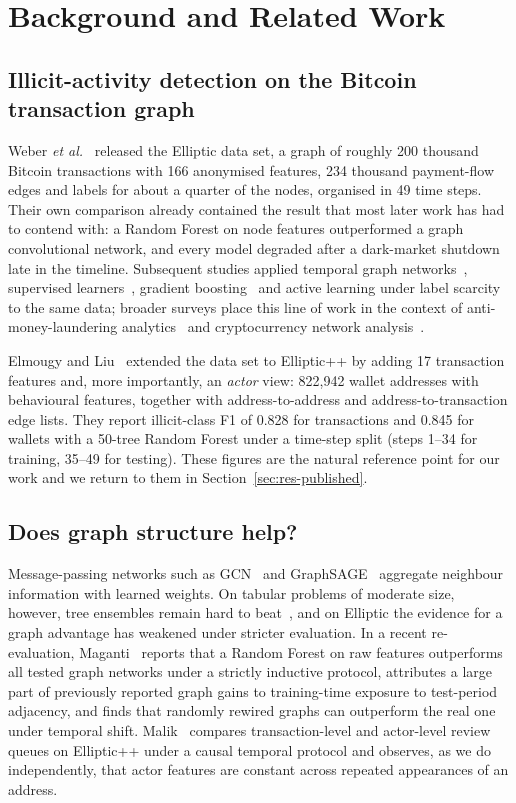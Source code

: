 \section{Background and Related Work}\label{sec:related}

\subsection{Illicit-activity detection on the Bitcoin transaction graph}
Weber \emph{et al.}~\cite{weber2019} released the Elliptic data set, a graph of roughly 200 thousand Bitcoin transactions with 166 anonymised features, 234 thousand payment-flow edges and labels for about a quarter of the nodes, organised in 49 time steps. Their own comparison already contained the result that most later work has had to contend with: a Random Forest on node features outperformed a graph convolutional network, and every model degraded after a dark-market shutdown late in the timeline. Subsequent studies applied temporal graph networks~\cite{pareja2020}, supervised learners~\cite{alarab2020}, gradient boosting~\cite{vassallo2021} and active learning under label scarcity~\cite{lorenz2020} to the same data; broader surveys place this line of work in the context of anti-money-laundering analytics~\cite{chen2018} and cryptocurrency network analysis~\cite{wu2021}.

Elmougy and Liu~\cite{elmougy2023} extended the data set to Elliptic++ by adding 17 transaction features and, more importantly, an \emph{actor} view: 822,942 wallet addresses with behavioural features, together with address-to-address and address-to-transaction edge lists. They report illicit-class F1 of 0.828 for transactions and 0.845 for wallets with a 50-tree Random Forest under a time-step split (steps 1--34 for training, 35--49 for testing). These figures are the natural reference point for our work and we return to them in Section~\ref{sec:res-published}.

\subsection{Does graph structure help?}
Message-passing networks such as GCN~\cite{kipf2017} and GraphSAGE~\cite{hamilton2017} aggregate neighbour information with learned weights. On tabular problems of moderate size, however, tree ensembles remain hard to beat~\cite{grinsztajn2022,shwartz2022}, and on Elliptic the evidence for a graph advantage has weakened under stricter evaluation. In a recent re-evaluation, Maganti~\cite{maganti2026} reports that a Random Forest on raw features outperforms all tested graph networks under a strictly inductive protocol, attributes a large part of previously reported graph gains to training-time exposure to test-period adjacency, and finds that randomly rewired graphs can outperform the real one under temporal shift. Malik~\cite{malik2026} compares transaction-level and actor-level review queues on Elliptic++ under a causal temporal protocol and observes, as we do independently, that actor features are constant across repeated appearances of an address.

